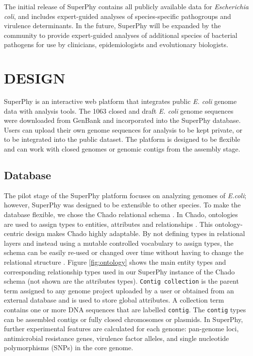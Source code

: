 \documentclass[a4paper,twoside]{article}
\begin{document}
The initial release of SuperPhy contains all publicly available data for \textit{Escherichia coli}, and includes expert-guided analyses of species-specific pathogroups and virulence determinants. In the future, SuperPhy will be expanded by the community to provide expert-guided analyses of additional species of bacterial pathogens for use by clinicians, epidemiologists and evolutionary biologists.

\section{\uppercase{Design}}
\label{sec:design}

\noindent SuperPhy is an interactive web platform that integrates public \textit{E. coli} genome data with analysis tools. The 1063 closed and draft \textit{E. coli} genome sequences were downloaded from GenBank and incorporated into the SuperPhy database. Users can upload their own genome sequences for analysis to be kept private, or to be integrated into the public dataset. The platform is designed to be flexible and can work with closed genomes or genomic contigs from the assembly stage. 

\subsection{Database}

The pilot stage of the SuperPhy platform focuses on analyzing genomes of \textit{E.coli}; however, SuperPhy was designed to be extensible to other species. To make the database flexible, we chose the Chado relational schema \cite{mungall2007chado}. In Chado, ontologies are used to assign types to entities, attributes and relationships \cite{mungall2007chado}. This ontology-centric design makes Chado highly adaptable. By not defining types in relational layers and instead using a mutable controlled vocabulary to assign types, the schema can be easily re-used or changed over time without having to change the relational structure \cite{mungall2007chado}.  Figure \ref{fig:ontology} shows the main entity types and corresponding relationship types used in our SuperPhy instance of the Chado schema (not shown are the attributes types). \texttt{Contig collection} is the parent term assigned to any genome project uploaded by a user or obtained from an external database and is used to store global attributes. A collection term contains one or more DNA sequences that are labelled \texttt{contig}. The \texttt{contig} types can be assembled contigs or fully closed chromosomes or plasmids. In SuperPhy, further experimental features are calculated for each genome: pan-genome loci, antimicrobial resistance genes, virulence factor alleles, and single nucleotide polymorphisms (SNPs) in the core genome.
\end{document}
